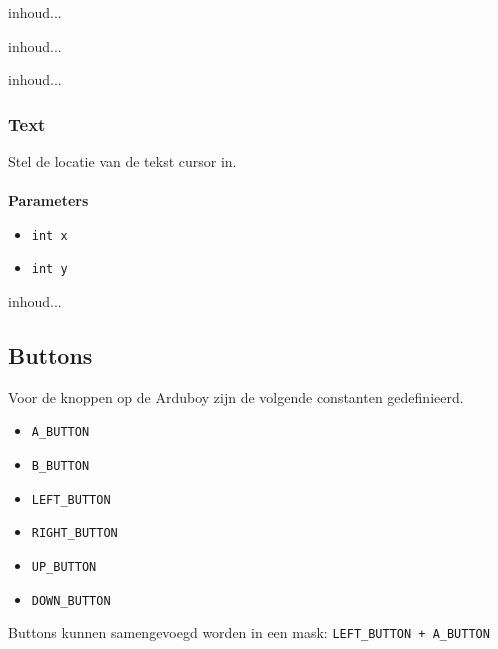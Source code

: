 \documentclass[11pt,fleqn]{book} %
\begin{document}
\begin{libf}[fillRoundRect(x, y, w, h, r, \emph{color=WHITE})]
	inhoud...
\end{libf}

\begin{libf}[fillTriangle(x0, y0, x1, y1, x2, y2, \emph{color=WHITE})]
	inhoud...
\end{libf}

\begin{libf}[fillScreen(\emph{color=WHITE})]
	inhoud...
\end{libf}

\subsubsection{Text}
\begin{libf}[setCursor(x, y)]
	Stel de locatie van de tekst cursor in.\\ \\
	\textbf{Parameters}
	\begin{itemize}
		\item \texttt{int x}
		\item \texttt{int y}
	\end{itemize}
\end{libf}

\begin{libf}
	inhoud...
\end{libf}

\subsection{Buttons}

\begin{libf}[Buttons]
	Voor de knoppen op de Arduboy zijn de volgende constanten gedefinieerd.
	\begin{multicols}{3}
		\begin{itemize}
			\item \texttt{A\_BUTTON}
			\item \texttt{B\_BUTTON}
			\item \texttt{LEFT\_BUTTON}
			\item \texttt{RIGHT\_BUTTON}
			\item \texttt{UP\_BUTTON}
			\item \texttt{DOWN\_BUTTON}
		\end{itemize}
	\end{multicols}
	
	Buttons kunnen samengevoegd worden in een mask: \texttt{LEFT\_BUTTON + A\_BUTTON}
\end{libf}
\end{document}
